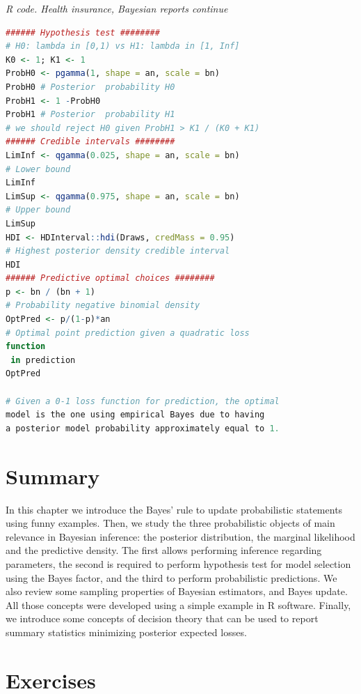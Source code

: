 \begin{tcolorbox}[enhanced,width=4.67in,center upper,
	fontupper=\large\bfseries,drop shadow southwest,sharp corners]
	\textit{R code. Health insurance, Bayesian reports continue}
\begin{VF}
\begin{lstlisting}[basicstyle=\footnotesize, language=R]
###### Hypothesis test ########
# H0: lambda in [0,1) vs H1: lambda in [1, Inf]
K0 <- 1; K1 <- 1
ProbH0 <- pgamma(1, shape = an, scale = bn) 
ProbH0 # Posterior  probability H0
ProbH1 <- 1 -ProbH0
ProbH1 # Posterior  probability H1
# we should reject H0 given ProbH1 > K1 / (K0 + K1) 
###### Credible intervals ########
LimInf <- qgamma(0.025, shape = an, scale = bn) 
# Lower bound
LimInf
LimSup <- qgamma(0.975, shape = an, scale = bn) 
# Upper bound
LimSup
HDI <- HDInterval::hdi(Draws, credMass = 0.95) 
# Highest posterior density credible interval
HDI
###### Predictive optimal choices ########
p <- bn / (bn + 1) 
# Probability negative binomial density
OptPred <- p/(1-p)*an 
# Optimal point prediction given a quadratic loss 
function
 in prediction
OptPred

# Given a 0-1 loss function for prediction, the optimal 
model is the one using empirical Bayes due to having
a posterior model probability approximately equal to 1.
\end{lstlisting}
\end{VF}
\end{tcolorbox}


\section{Summary}
In this chapter we introduce the Bayes' rule to update probabilistic statements using funny examples. Then, we study  the three probabilistic objects of main relevance in Bayesian inference: the posterior distribution, the marginal likelihood and the predictive density. The first allows performing inference regarding parameters, the second is required to perform hypothesis test for model selection using the Bayes factor, and the third to perform probabilistic predictions. We also review some sampling properties of Bayesian estimators, and Bayes update. All those concepts were developed using a simple example in R software. Finally, we introduce some concepts of decision theory that can be used to report summary statistics minimizing posterior expected losses.
 
\section{Exercises}

